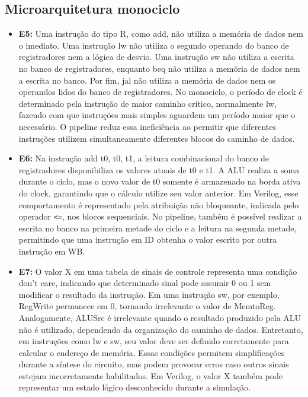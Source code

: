 \documentclass[12pt,a4paper,titlepage]{article}
\begin{document}
\subsection{Microarquitetura monociclo}
\begin{itemize}
    \item\textbf{E5:}
        Uma instrução do tipo R, como add, não utiliza a memória de dados nem o imediato. Uma instrução lw não utiliza o segundo
        operando do banco de registradores nem a lógica de desvio. Uma instrução sw não utiliza a escrita no banco de registradores,
        enquanto beq não utiliza a memória de dados nem a escrita no banco. Por fim, jal não utiliza a memória de dados nem os
        operandos lidos do banco de registradores.
        No monociclo, o período de clock é determinado pela instrução de maior caminho crítico, normalmente lw, fazendo com que
        instruções mais simples aguardem um período maior que o necessário. O pipeline reduz essa ineficiência ao permitir que
        diferentes instruções utilizem simultaneamente diferentes blocos do caminho de dados.

    \item\textbf{E6:}
        Na instrução add t0, t0, t1, a leitura combinacional do banco de registradores disponibiliza os valores atuais de t0 e t1.
        A ALU realiza a soma durante o ciclo, mas o novo valor de t0 somente é armazenado na borda ativa do clock, garantindo
        que o cálculo utilize seu valor anterior.
        Em Verilog, esse comportamento é representado pela atribuição não bloqueante, indicada pelo operador \texttt{<=},
        nos blocos sequenciais. No pipeline, também é possível realizar a escrita no banco na primeira metade do ciclo e a
        leitura na segunda metade, permitindo que uma instrução em ID obtenha o valor escrito por outra instrução em WB.

    \item\textbf{E7:}
        O valor X em uma tabela de sinais de controle representa uma condição don't care, indicando que determinado sinal pode
        assumir 0 ou 1 sem modificar o resultado da instrução.
        Em uma instrução sw, por exemplo, RegWrite permanece em 0, tornando irrelevante o valor de MemtoReg.
        Analogamente, ALUSrc é irrelevante quando o resultado produzido pela ALU não é utilizado, dependendo da organização
        do caminho de dados. Entretanto, em instruções como lw e sw, seu valor deve ser definido corretamente para calcular
        o endereço de memória.
        Essas condições permitem simplificações durante a síntese do circuito, mas podem provocar erros caso outros sinais
        estejam incorretamente habilitados. Em Verilog, o valor X também pode representar um estado lógico desconhecido
        durante a simulação.
\end{itemize}
\end{document}
